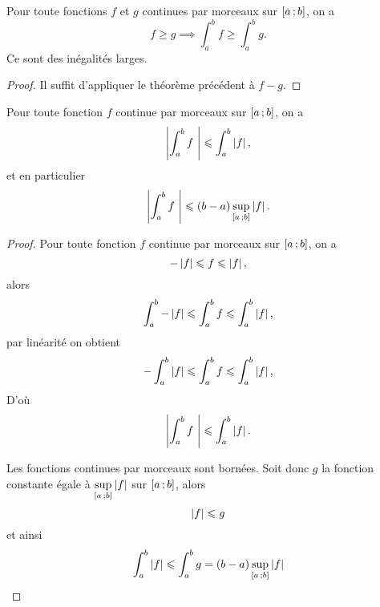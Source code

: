 \begin{theo}
   Pour toute fonctions \(f\) et \(g\) continues par morceaux sur \(\left[ a \, ;  b \right]\), on a
  \begin{equation}
    f \geqslant g \implies \int_a^b f \geqslant \int_a^b g.
  \end{equation}
  \danger Ce sont des inégalités larges.
\end{theo}
\begin{proof}
  Il suffit d'appliquer le théorème précédent à \(f-g\).
\end{proof}

\begin{theo}
  Pour toute fonction \(f\) continue par morceaux sur \(\left[ a \, ;  b \right]\), on a
  \begin{equation}
    \left\lvert\int_a^b f~\right\rvert \leqslant \int_a^b \left\lvert f\right\rvert,
  \end{equation}
  et en particulier
  \begin{equation}
    \left\lvert\int_a^b f~\right\rvert \leqslant (b-a) \sup\limits_{\left[ a \, ;  b \right]} \left\lvert f\right\rvert.
  \end{equation}
\end{theo}
\begin{proof}
  Pour toute fonction \(f\) continue par morceaux sur \(\left[ a \, ;  b \right]\), on a
  \begin{equation}
    -\left\lvert f\right\rvert \leqslant f \leqslant \left\lvert f\right\rvert,
  \end{equation}
  alors
  \begin{equation}
    \int_a^b -\left\lvert f\right\rvert \leqslant \int_a^bf \leqslant \int_a^b\left\lvert f\right\rvert,
  \end{equation}
  par linéarité on obtient
  \begin{equation}
    -\int_a^b \left\lvert f\right\rvert \leqslant \int_a^bf \leqslant \int_a^b\left\lvert f\right\rvert,
  \end{equation}
  D'où
  \begin{equation}
     \left\lvert\int_a^b f~\right\rvert \leqslant \int_a^b \left\lvert f\right\rvert.
  \end{equation}

  Les fonctions continues par morceaux sont bornées. Soit donc \(g\) la fonction constante égale à \(\sup\limits_{\left[ a \, ;  b \right]} \left\lvert f\right\rvert\) sur \(\left[ a \, ;  b \right]\), alors
  \begin{equation}
    \left\lvert f\right\rvert \leqslant g
  \end{equation}
  et ainsi
  \begin{equation}
    \int_a^b \left\lvert f\right\rvert \leqslant \int_a^b g = (b-a) \sup\limits_{\left[ a \, ;  b \right]} \left\lvert f\right\rvert
  \end{equation}
\end{proof}


